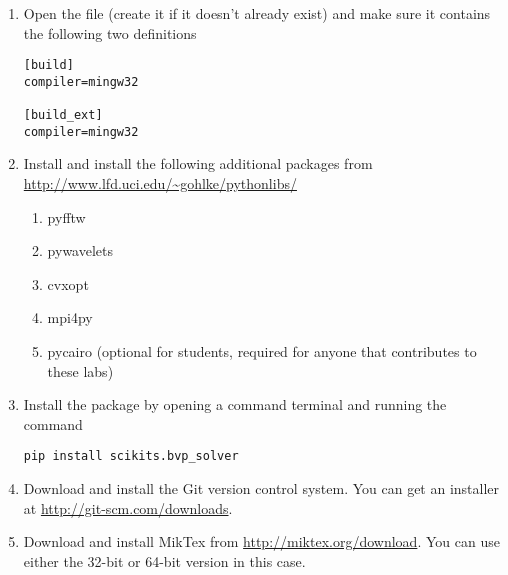 \begin{enumerate}
\item Open the file  (create it if it doesn't already exist) and make sure it contains the following two definitions
\begin{lstlisting}
[build]
compiler=mingw32

[build_ext]
compiler=mingw32
\end{lstlisting}

\item Install and install the following additional packages from \url{http://www.lfd.uci.edu/~gohlke/pythonlibs/}
\begin{enumerate}
	\item pyfftw
	\item pywavelets
	\item cvxopt
	\item mpi4py
	\item pycairo (optional for students, required for anyone that contributes to these labs)
\end{enumerate}

\item Install the  package by opening a command terminal and running the command
\begin{lstlisting}[style=ShellInput]
pip install scikits.bvp_solver
\end{lstlisting}

\item Download and install the Git version control system.
You can get an installer at \url{http://git-scm.com/downloads}.

\item Download and install MikTex from \url{http://miktex.org/download}.
You can use either the 32-bit or 64-bit version in this case.

\end{enumerate}

